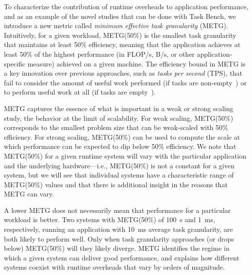 To characterize the contribution of runtime overheads
to application performance, and as an example of the novel studies that can be done
with Task Bench, we introduce a new metric called
\emph{minimum effective task granularity} (METG). Intuitively, for a given
workload, METG(50\%) is the smallest task granularity that maintains
at least 50\% efficiency, meaning that the application achieves at
least 50\% of the highest performance (in FLOP/s, B/s, or other
application-specific measure) achieved on a given
machine. The efficiency bound in METG is a key innovation over
previous approaches, such as \emph{tasks per second} (TPS), that fail
to consider the amount of useful work performed (if tasks are
non-empty~\cite{Canary16, Armstrong14}) or to perform useful work at all (if tasks are empty~\cite{LegionTracing18}).

METG captures the essence of what is important in a
weak or strong scaling study, the behavior at the limit of
scalability. For weak scaling, METG(50\%) corresponds to the
smallest problem size that can be weak-scaled with 50\%
efficiency. For strong scaling, METG(50\%) can be used to compute the
scale at which performance can be expected to dip below 50\%
efficiency.  We note that METG(50\%) for a given runtime system will
vary with the particular application and the underlying hardware---i.e., METG(50\%)
is not a constant for a given system, but we will see that individual systems have
a characteristic range of METG(50\%) values and that there is additional insight
in the reasons that METG can vary.

A lower METG does not necessarily mean that
performance for a particular workload is better. Two systems with METG(50\%) of 100~\textmu{}s and 1~ms,
respectively, running an application with 10~ms average task granularity, are both likely to perform well. Only when task
granularity approaches (or drops below) METG(50\%) will they
likely diverge. METG identifies the regime in which a
given system can deliver good performance, and explains how
different systems coexist with runtime overheads that vary by orders of magnitude.

